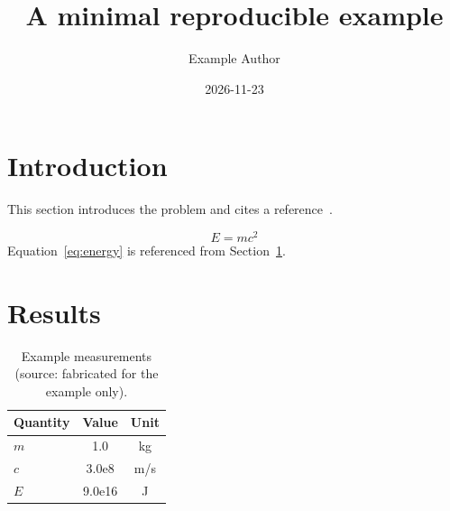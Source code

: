 \documentclass[10pt,a4paper]{article}
\title{A minimal reproducible example}
\author{Example Author}
\date{2026-11-23}
\begin{document}
\maketitle

\section{Introduction}\label{sec:intro}
This section introduces the problem and cites a reference~\cite{knuth1984texbook}.

\begin{equation}\label{eq:energy}
E = mc^{2}
\end{equation}
Equation~\eqref{eq:energy} is referenced from Section~\ref{sec:intro}.

\section{Results}\label{sec:results}
\begin{table}[htbp]
  \centering
  \caption{Example measurements (source: fabricated for the example only).}
  \label{tab:example}
  \begin{tabular}{lcc}
    \toprule
    Quantity & Value & Unit \\
    \midrule
    $m$  & 1.0  & kg \\
    $c$  & 3.0e8 & m/s \\
    $E$  & 9.0e16 & J \\
    \bottomrule
  \end{tabular}
\end{table}



\end{document}
